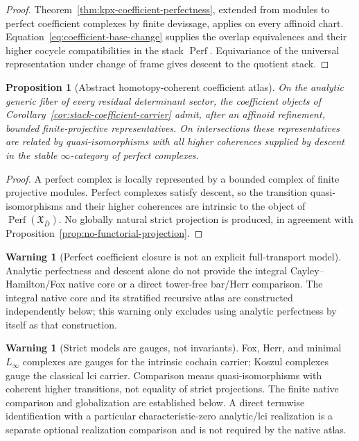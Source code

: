 \documentclass[11pt]{article}
\newtheorem{proposition}[theorem]{Proposition}
\theoremstyle{definition}
\newtheorem{warning}[theorem]{Warning}
\newcommand{\Perf}{\operatorname{Perf}}
\begin{document}
\begin{proof}
Theorem~\ref{thm:kpx-coefficient-perfectness}, extended from modules to perfect coefficient complexes by finite devissage, applies on every affinoid chart.  Equation~\eqref{eq:coefficient-base-change} supplies the overlap equivalences and their higher cocycle compatibilities in the stack $\Perf$.  Equivariance of the universal representation under change of frame gives descent to the quotient stack.
\end{proof}

\begin{proposition}[Abstract homotopy-coherent coefficient atlas]\label{prop:abstract-coeff-atlas}
On the analytic generic fiber of every residual determinant sector, the coefficient objects of Corollary~\ref{cor:stack-coefficient-carrier} admit, after an affinoid refinement, bounded finite-projective representatives.  On intersections these representatives are related by quasi-isomorphisms with all higher coherences supplied by descent in the stable $\infty$-category of perfect complexes.
\end{proposition}

\begin{proof}
A perfect complex is locally represented by a bounded complex of finite projective modules.  Perfect complexes satisfy descent, so the transition quasi-isomorphisms and their higher coherences are intrinsic to the object of $\Perf(\mathfrak X_{\bar D})$.  No globally natural strict projection is produced, in agreement with Proposition~\ref{prop:no-functorial-projection}.
\end{proof}

\begin{warning}[Perfect coefficient closure is not an explicit full-transport model]\label{warn:coeff-perfect-not-explicit}
Analytic perfectness and descent alone do not provide the integral Cayley--Hamilton/Fox native core or a direct tower-free bar/Herr comparison.  The integral native core and its stratified recursive atlas are constructed independently below; this warning only excludes using analytic perfectness by itself as that construction.
\end{warning}

\begin{warning}[Strict models are gauges, not invariants]\label{warn:strict-model-gauge}
Fox, Herr, and minimal $L_\infty$ complexes are gauges for the intrinsic cochain carrier; Koszul complexes gauge the classical lci carrier.  Comparison means quasi-isomorphisms with coherent higher transitions, not equality of strict projections.  The finite native comparison and globalization are established below.  A direct termwise identification with a particular characteristic-zero analytic/lci realization is a separate optional realization comparison and is not required by the native atlas.
\end{warning}
\end{document}
